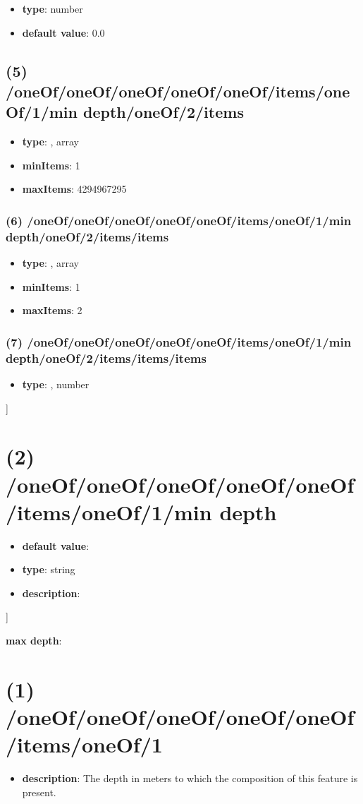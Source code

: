 \begin{itemize}[leftmargin=6em]\item {\bf type}: number\item {\bf default value}: 0.0
\end{itemize}\subsection{(5) /oneOf/oneOf/oneOf/oneOf/oneOf/items/oneOf/1/min depth/oneOf/2/items}
\begin{itemize}[leftmargin=5em]\item {\bf type}: , array\item {\bf minItems}: 1
\item {\bf maxItems}: 4294967295
\end{itemize}\subsubsection{(6) /oneOf/oneOf/oneOf/oneOf/oneOf/items/oneOf/1/min depth/oneOf/2/items/items}
\begin{itemize}[leftmargin=6em]\item {\bf type}: , array\item {\bf minItems}: 1
\item {\bf maxItems}: 2
\end{itemize}\subsubsection{(7) /oneOf/oneOf/oneOf/oneOf/oneOf/items/oneOf/1/min depth/oneOf/2/items/items/items}
\begin{itemize}[leftmargin=7em]\item {\bf type}: , number\end{itemize}]\section{(2) /oneOf/oneOf/oneOf/oneOf/oneOf/items/oneOf/1/min depth}
\begin{itemize}[leftmargin=2em]\item {\bf default value}: 
\item {\bf type}: string
\item {\bf description}: 
\end{itemize}]\item {\bf max depth}: \section{(1) /oneOf/oneOf/oneOf/oneOf/oneOf/items/oneOf/1}
\begin{itemize}[leftmargin=1em]\item {\bf description}: The depth in meters to which the composition of this feature is present.
\end{itemize}
